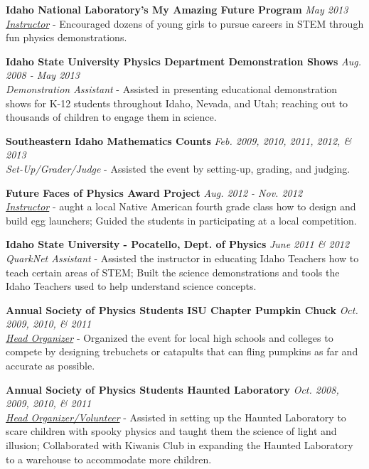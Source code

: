 \outreachspace
\textbf{Idaho National Laboratory's My Amazing Future Program} \hfill \textit{May 2013}\\
\textit{\href{https://inlportal.inl.gov/portal/server.pt?open=514&objID=1269&mode=2&featurestory=DA_575131}{Instructor}} - Encouraged dozens of young girls to pursue careers in STEM through fun physics demonstrations. 

\outreachspace
\textbf{Idaho State University Physics Department Demonstration Shows} \hfill \textit{Aug. 2008 - May 2013}\\
\textit{Demonstration Assistant} - Assisted in presenting educational demonstration shows for K-12 students throughout Idaho, Nevada, and Utah; reaching out to thousands of children to engage them in science.

\outreachspace
\textbf{Southeastern Idaho Mathematics Counts} \hfill \textit{Feb. 2009, 2010, 2011, 2012, \& 2013}\\
\textit{Set-Up/Grader/Judge} - Assisted the event by setting-up, grading, and judging.

\outreachspace
\textbf{Future Faces of Physics Award Project} \hfill \textit{Aug. 2012 - Nov. 2012}\\
\textit{\href{http://www.spsnational.org/programs/awards/2012/FFoP/ffop_recipients.htm}{Instructor}} - aught a local Native American fourth grade class how to design and build egg launchers; Guided the students in participating at a local competition.

\outreachspace
\textbf{Idaho State University - Pocatello, Dept. of Physics} \hfill \textit{June 2011 \& 2012}\\
\textit{QuarkNet Assistant} - Assisted the instructor in educating Idaho Teachers how to teach certain areas of STEM; Built the science demonstrations and tools the Idaho Teachers used to help understand science concepts.

\outreachspace
\textbf{Annual Society of Physics Students ISU Chapter Pumpkin Chuck} \hfill \textit{Oct. 2009, 2010, \& 2011}\\
\textit{\href{http://www.idahostatejournal.com/news/local/article_845b6364-cc47-11de-b59c-001cc4c002e0.html}{Head Organizer}} - Organized the event for local high schools and colleges to compete by designing trebuchets or catapults that can fling pumpkins as far and accurate as possible.

\outreachspace
\textbf{Annual Society of Physics Students Haunted Laboratory} \hfill \textit{Oct. 2008, 2009, 2010, \& 2011}\\
\textit{\href{http://www.isu.edu/headlines/?p=3408}{Head Organizer/Volunteer}} - Assisted in setting up the Haunted Laboratory to scare children with spooky physics and taught them the science of light and illusion; Collaborated with Kiwanis Club in expanding the Haunted Laboratory to a warehouse to accommodate more children.


